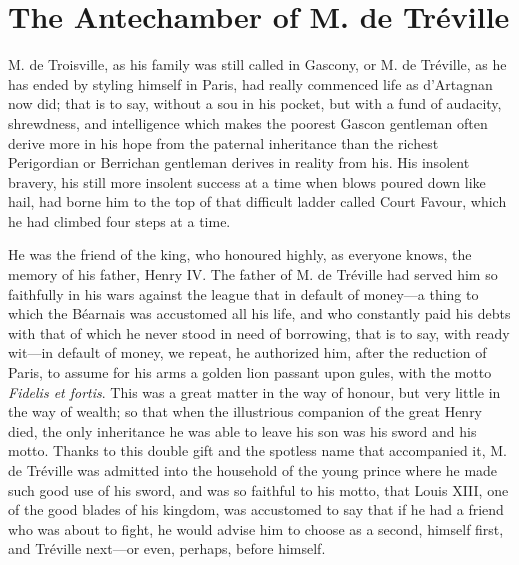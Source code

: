 
\chapter{The Antechamber of M. de Tréville} 
	
	\lettrine[]{M}{.} de Troisville, as his family was still called in Gascony, or M. de Tréville, as he has ended by styling himself in Paris, had really commenced life as d'Artagnan now did; that is to say, without a sou in his pocket, but with a fund of audacity, shrewdness, and intelligence which makes the poorest Gascon gentleman often derive more in his hope from the paternal inheritance than the richest Perigordian or Berrichan gentleman derives in reality from his. His insolent bravery, his still more insolent success at a time when blows poured down like hail, had borne him to the top of that difficult ladder called Court Favour, which he had climbed four steps at a time. 

He was the friend of the king, who honoured highly, as everyone knows, the memory of his father, Henry IV. The father of M. de Tréville had served him so faithfully in his wars against the league that in default of money---a thing to which the Béarnais was accustomed all his life, and who constantly paid his debts with that of which he never stood in need of borrowing, that is to say, with ready wit---in default of money, we repeat, he authorized him, after the reduction of Paris, to assume for his arms a golden lion passant upon gules, with the motto \textit{Fidelis et fortis}. This was a great matter in the way of honour, but very little in the way of wealth; so that when the illustrious companion of the great Henry died, the only inheritance he was able to leave his son was his sword and his motto. Thanks to this double gift and the spotless name that accompanied it, M. de Tréville was admitted into the household of the young prince where he made such good use of his sword, and was so faithful to his motto, that Louis XIII, one of the good blades of his kingdom, was accustomed to say that if he had a friend who was about to fight, he would advise him to choose as a second, himself first, and Tréville next---or even, perhaps, before himself. 

